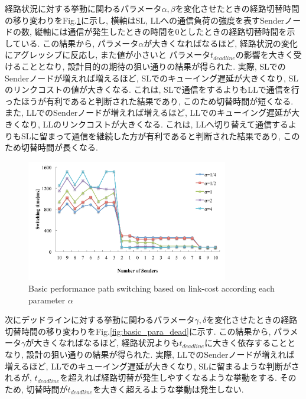 経路状況に対する挙動に関わるパラメータ$\alpha,
\beta$を変化させたときの経路切替時間の移り変わりをFig.\ref{fig:basic_para_link}に示し, 横軸はSL, LLへの通信負荷の強度を表すSenderノードの数, 縦軸には通信が発生したときの時間を0としたときの経路切替時間を示している. 
この結果から, パラメータ$\alpha$が大きくなればなるほど, 経路状況の変化にアグレッシブに反応し, また値が小さいと
パラメータ$t_{deadline}$の影響を大きく受けることとなり, 設計目的の期待の狙い通りの結果が得られた. 
実際, SLでのSenderノードが増えれば増えるほど, SLでのキューイング遅延が大きくなり, SLのリンクコストの値が大きくなる. 
これは, SLで通信をするよりもLLで通信を行ったほうが有利であると判断された結果であり, このため切替時間が短くなる. 
また, LLでのSenderノードが増えれば増えるほど, LLでのキューイング遅延が大きくなり, LLのリンクコストが大きくなる. 
これは, LLへ切り替えて通信するよりもSLに留まって通信を継続した方が有利であると判断された結果であり, このため切替時間が長くなる. 

\begin{figure}[t]
    \begin{center}
    \includegraphics[autoebb, width=250pt]{./img/param_alpha.pdf}
    \caption{Basic performance path switching based on
    link-cost according each parameter $\alpha$}
    \label{fig:basic_para_link}
    \end{center}
\end{figure}


次にデッドラインに対する挙動に関わるパラメータ$\gamma,
\delta$を変化させたときの経路切替時間の移り変わりをFig.\ref{fig:basic_para_dead}に示す.
この結果から, パラメータ$\gamma$が大きくなればなるほど, 経路状況よりも$t_{deadline}$に大きく依存することとなり,
設計の狙い通りの結果が得られた.
実際, LLでのSenderノードが増えれば増えるほど, LLでのキューイング遅延が大きくなり, SLに留まるような判断がされるが,
$t_{deadline}$を超えれば経路切替が発生しやすくなるような挙動をする.
そのため, 切替時間が$t_{deadline}$を大きく超えるような挙動は発生しない. 

